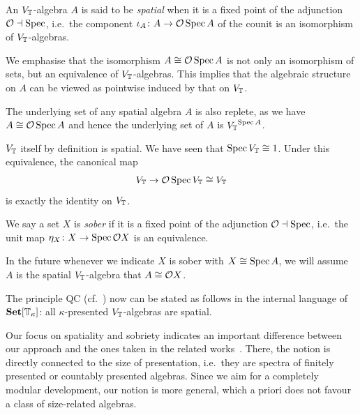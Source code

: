 \begin{definition}
  An ${V_{\mathbb{T}}}$-algebra $A$ is said to be \emph{spatial} when it is a fixed point of the adjunction $\mathcal{O} \dashv \operatorname{Spec}$, i.e.\ the component $\iota_A\colon A \to \mathcal{O} \operatorname{Spec} A$ of the counit is an isomorphism of ${V_{\mathbb{T}}}$-algebras.
\end{definition}

We emphasise that the isomorphism $A \cong \mathcal{O}\operatorname{Spec} A$ is not only an isomorphism of sets, but an equivalence of ${V_{\mathbb{T}}}$-algebras. This implies that the algebraic structure on $A$ can be viewed as pointwise induced by that on ${V_{\mathbb{T}}}$. 

\begin{remark}\label{rem:qcreplete}
  The underlying set of any spatial algebra $A$ is also replete, as we have $A\cong \mathcal{O}\operatorname{Spec}{A}$ and hence the underlying set of $A$ is ${V_{\mathbb{T}}}^{\operatorname{Spec}{A}}$.
\end{remark}

\begin{example}\label{exm:intervalqc}
  ${V_{\mathbb{T}}}$ itself by definition is spatial. We have seen that $\operatorname{Spec} {V_{\mathbb{T}}} \cong 1$. Under this equivalence, the canonical map 
  \[ {V_{\mathbb{T}}} \to \mathcal{O}\operatorname{Spec} {V_{\mathbb{T}}} \cong {V_{\mathbb{T}}} \]
  is exactly the identity on ${V_{\mathbb{T}}}$.
\end{example}

\begin{definition}
  We say a set $X$ is \emph{sober} if it is a fixed point of the adjunction $\mathcal{O} \dashv \operatorname{Spec}$, i.e.\ the unit map $\eta_X\colon X \to \operatorname{Spec}\mathcal{O} X$ is an equivalence.
\end{definition}

In the future whenever we indicate $X$ is sober with $X \cong \operatorname{Spec} A$, we will assume $A$ is the spatial ${V_{\mathbb{T}}}$-algebra that $A \cong \mathcal{O} X$.

\begin{remark}\label{rem:qcasspatialalgebra}
  The principle \gls{QC} (cf.~) now can be stated as follows in the internal language of $\mathbf{Set}[\mathbb{T}_\kappa]$: all $\kappa$-presented $V_{\mathbb{T}}$-algebras are spatial.
\end{remark}

\begin{remark}
  Our focus on spatiality and sobriety indicates an important difference between our approach and the ones taken in the related works~\citep{Cherubini_Coquand_Hutzler_2024,cherubini2024foundation}. There, the notion is directly connected to the size of presentation, i.e.\ they are spectra of finitely presented or countably presented algebras. Since we aim for a completely modular development, our notion is more general, which a priori does not favour a class of size-related algebras. 
\end{remark}

